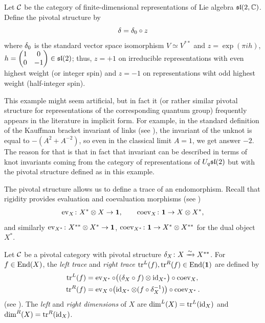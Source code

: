 \begin{example}\label{x:sl2-pivotal}
  Let $\mathcal{C}$ be the category of finite-dimensional representations of Lie
  algebra $\mathfrak{sl}(2,\mathbb{C})$. Define the pivotal structure by
  $$
    \delta=\delta_0\circ z
  $$
  where $\delta_0$ is the standard vector space isomorphism $V\simeq V^{**}$ and
  $z=\exp(\pi i h)$, $h=\begin{pmatrix} 1 & 0\\ 0 &-1\end{pmatrix}\in \mathfrak{sl}(2)$;
  thus, $z=+1$ on irreducible representations with even highest weight (or
  integer spin)  and $z=-1$ on representations wiht odd highest weight
  (half-integer spin).

  This example might seem artificial, but in fact it (or rather similar pivotal
  structure for representations of the corresponding quantum group) frequently
  appears in the literature in implicit form. For example, in the standard
  definition of the Kauffman bracket invariant of links (see ),
  the invariant of the unknot is equal to $-(A^2+A^{-2})$, so even in the
  classical limit $A=1$, we get answer $-2$. The reason for that is that in
  fact that invariant can be described in terms of knot invariants coming from
  the category of representations of $U_q\mathfrak{sl}(2)$ but with the pivotal
  structure defined as in this example.
\end{example}

The pivotal structure allows us to define a trace of an endomorphism. Recall
that rigidity provides evaluation and coevaluation morphisms (see
)
$$
  \operatorname{ev}_X\colon X^*\otimes X\to \mathbf{1},\qquad \operatorname{coev}_X\colon \mathbf{1}\to X\otimes X^*,
$$
and similarly $\operatorname{ev}_{X^*}\colon X^{**}\otimes X^*\to \mathbf{1}$,
$\operatorname{coev}_{X^*}\colon \mathbf{1}\to X^*\otimes X^{**}$ for the dual object $X^*$.

\begin{definition}\label{d:traces}
  Let $\mathcal{C}$ be a pivotal category with pivotal structure $\delta_X\colon X\xrightarrow{\sim}
  X^{**}$. For $f\in \operatorname{End}(X)$, the \emph{left trace} and \emph{right
  trace}
  $\operatorname{tr}^L(f),\operatorname{tr}^R(f)\in \operatorname{End}(\mathbf{1})$ are defined by
  \begin{align*}
    \operatorname{tr}^L(f) &= \operatorname{ev}_{X^*}\circ\bigl((\delta_X\circ f)\otimes \operatorname{id}_{X^*}\bigr)\circ
                \operatorname{coev}_X,\\
    \operatorname{tr}^R(f) &= \operatorname{ev}_X\circ\bigl(\operatorname{id}_{X^*}\otimes (f\circ\delta_X^{-1})\bigr)\circ
                \operatorname{coev}_{X^*}.
  \end{align*}
  (see ).
  The \emph{left} and \emph{right dimensions} of $X$ are
  $\dim^L(X)=\operatorname{tr}^L(\operatorname{id}_X)$ and $\dim^R(X)=\operatorname{tr}^R(\operatorname{id}_X)$.
\end{definition}

